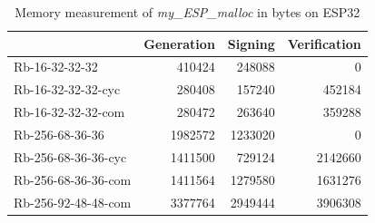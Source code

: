 \documentclass[thesis=M,english]{FITthesis}[2019/12/23]
\begin{document}
\begin{table}[]
\centering
\begin{tabular}{|l|r|r|r|}
\hline
                    & \multicolumn{1}{l|}{Generation} & \multicolumn{1}{l|}{Signing} & \multicolumn{1}{l|}{Verification} \\ \hline
Rb-16-32-32-32      & 410424                          & 248088                       & 0                                 \\ \hline
Rb-16-32-32-32-cyc  & 280408                          & 157240                       & 452184                            \\ \hline
Rb-16-32-32-32-com  & 280472                          & 263640                       & 359288                            \\ \hline
Rb-256-68-36-36     & 1982572                         & 1233020                      & 0                                 \\ \hline
Rb-256-68-36-36-cyc & 1411500                         & 729124                       & 2142660                           \\ \hline
Rb-256-68-36-36-com & 1411564                         & 1279580                      & 1631276                           \\ \hline
Rb-256-92-48-48-com & 3377764                         & 2949444                      & 3906308                           \\ \hline
\end{tabular}
\caption{Memory measurement of \textit{my\_ESP\_malloc} in bytes on ESP32}
\end{table}
\end{document}
